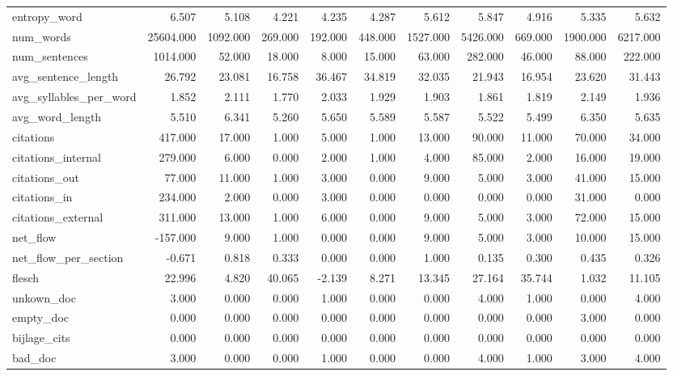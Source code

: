 \begin{tabular}{lrrrrrrrrrr}
\cline{1-11}
entropy\_word & 6.507 & 5.108 & 4.221 & 4.235 & 4.287 & 5.612 & 5.847 & 4.916 & 5.335 & 5.632 \\
\cline{1-11}
num\_words & 25604.000 & 1092.000 & 269.000 & 192.000 & 448.000 & 1527.000 & 5426.000 & 669.000 & 1900.000 & 6217.000 \\
\cline{1-11}
num\_sentences & 1014.000 & 52.000 & 18.000 & 8.000 & 15.000 & 63.000 & 282.000 & 46.000 & 88.000 & 222.000 \\
\cline{1-11}
avg\_sentence\_length & 26.792 & 23.081 & 16.758 & 36.467 & 34.819 & 32.035 & 21.943 & 16.954 & 23.620 & 31.443 \\
\cline{1-11}
avg\_syllables\_per\_word & 1.852 & 2.111 & 1.770 & 2.033 & 1.929 & 1.903 & 1.861 & 1.819 & 2.149 & 1.936 \\
\cline{1-11}
avg\_word\_length & 5.510 & 6.341 & 5.260 & 5.650 & 5.589 & 5.587 & 5.522 & 5.499 & 6.350 & 5.635 \\
\cline{1-11}
citations & 417.000 & 17.000 & 1.000 & 5.000 & 1.000 & 13.000 & 90.000 & 11.000 & 70.000 & 34.000 \\
\cline{1-11}
citations\_internal & 279.000 & 6.000 & 0.000 & 2.000 & 1.000 & 4.000 & 85.000 & 2.000 & 16.000 & 19.000 \\
\cline{1-11}
citations\_out & 77.000 & 11.000 & 1.000 & 3.000 & 0.000 & 9.000 & 5.000 & 3.000 & 41.000 & 15.000 \\
\cline{1-11}
citations\_in & 234.000 & 2.000 & 0.000 & 3.000 & 0.000 & 0.000 & 0.000 & 0.000 & 31.000 & 0.000 \\
\cline{1-11}
citations\_external & 311.000 & 13.000 & 1.000 & 6.000 & 0.000 & 9.000 & 5.000 & 3.000 & 72.000 & 15.000 \\
\cline{1-11}
net\_flow & -157.000 & 9.000 & 1.000 & 0.000 & 0.000 & 9.000 & 5.000 & 3.000 & 10.000 & 15.000 \\
\cline{1-11}
net\_flow\_per\_section & -0.671 & 0.818 & 0.333 & 0.000 & 0.000 & 1.000 & 0.135 & 0.300 & 0.435 & 0.326 \\
\cline{1-11}
flesch & 22.996 & 4.820 & 40.065 & -2.139 & 8.271 & 13.345 & 27.164 & 35.744 & 1.032 & 11.105 \\
\cline{1-11}
unkown\_doc & 3.000 & 0.000 & 0.000 & 1.000 & 0.000 & 0.000 & 4.000 & 1.000 & 0.000 & 4.000 \\
\cline{1-11}
empty\_doc & 0.000 & 0.000 & 0.000 & 0.000 & 0.000 & 0.000 & 0.000 & 0.000 & 3.000 & 0.000 \\
\cline{1-11}
bijlage\_cits & 0.000 & 0.000 & 0.000 & 0.000 & 0.000 & 0.000 & 0.000 & 0.000 & 0.000 & 0.000 \\
\cline{1-11}
bad\_doc & 3.000 & 0.000 & 0.000 & 1.000 & 0.000 & 0.000 & 4.000 & 1.000 & 3.000 & 4.000 \\
\cline{1-11}
\bottomrule
\end{tabular}
